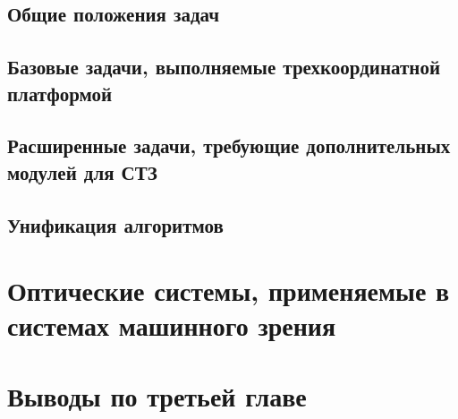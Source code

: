 \subsection{Общие положения задач}

\subsection{Базовые задачи, выполняемые трехкоординатной платформой}

\subsection{Расширенные задачи, требующие дополнительных модулей для СТЗ}

\subsection{Унификация алгоритмов}

\section{Оптические системы, применяемые в системах машинного зрения} \label{sect3_4}

\section{Выводы по третьей главе} \label{sect3_5}